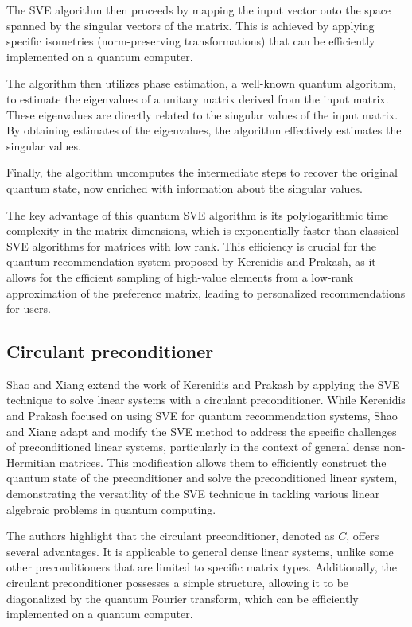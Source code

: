 \documentclass[12pt]{extarticle}
\begin{document}
The SVE algorithm then proceeds by mapping the input vector onto the space spanned by the singular vectors of the matrix.
This is achieved by applying specific isometries (norm-preserving transformations) that can be efficiently implemented on a quantum computer.

The algorithm then utilizes phase estimation, a well-known quantum algorithm, to estimate the eigenvalues of a unitary matrix derived from the input matrix.
These eigenvalues are directly related to the singular values of the input matrix.
By obtaining estimates of the eigenvalues, the algorithm effectively estimates the singular values.

Finally, the algorithm uncomputes the intermediate steps to recover the original quantum state, now enriched with information about the singular values.

The key advantage of this quantum SVE algorithm is its polylogarithmic time complexity in the matrix dimensions,
which is exponentially faster than classical SVE algorithms for matrices with low rank.
This efficiency is crucial for the quantum recommendation system proposed by Kerenidis and Prakash,
as it allows for the efficient sampling of high-value elements from a low-rank approximation of the preference matrix,
leading to personalized recommendations for users.

\subsection{Circulant preconditioner}


Shao and Xiang\cite{shao2018quantum} extend the work of Kerenidis and Prakash by applying the SVE technique to solve linear systems with a circulant preconditioner.
While Kerenidis and Prakash focused on using SVE for quantum recommendation systems,
Shao and Xiang adapt and modify the SVE method to address the specific challenges of preconditioned linear systems,
particularly in the context of general dense non-Hermitian matrices.
This modification allows them to efficiently construct the quantum state of the preconditioner and solve the preconditioned linear system,
demonstrating the versatility of the SVE technique in tackling various linear algebraic problems in quantum computing.

The authors highlight that the circulant preconditioner, denoted as $C$, offers several advantages.
It is applicable to general dense linear systems, unlike some other preconditioners that are limited to specific matrix types.
Additionally, the circulant preconditioner possesses a simple structure, allowing it to be diagonalized by the quantum Fourier transform, which can be efficiently implemented on a quantum computer.
\end{document}
